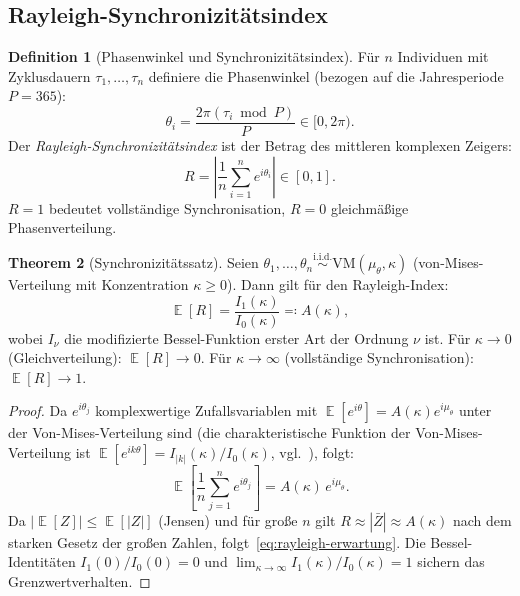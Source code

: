 ﻿\documentclass[12pt, a4paper]{article}
\theoremstyle{definition}
\newtheorem{theorem}{Theorem}[section]
\newtheorem{definition}[theorem]{Definition}
\DeclareMathOperator{\E}{\mathbb{E}}
\begin{document}
\subsection{Rayleigh-Synchronizitätsindex}

\begin{definition}[Phasenwinkel und Synchronizitätsindex]\label{def:rayleigh}
Für $n$ Individuen mit Zyklusdauern $\tau_1, \ldots, \tau_n$ definiere die
Phasenwinkel (bezogen auf die Jahresperiode $P = 365$):
\[
  \theta_i = \frac{2\pi (\tau_i \bmod P)}{P} \in [0, 2\pi).
\]
Der \emph{Rayleigh-Synchronizitätsindex} ist der Betrag des mittleren komplexen
Zeigers:
\begin{equation}\label{eq:rayleigh}
  R = \left|\frac{1}{n}\sum_{i=1}^n e^{i\theta_i}\right| \in [0, 1].
\end{equation}
$R = 1$ bedeutet vollständige Synchronisation, $R = 0$ gleichmäßige Phasenverteilung.
\end{definition}

\begin{theorem}[Synchronizitätssatz]\label{thm:synchronizitaet}
Seien $\theta_1, \ldots, \theta_n \overset{\text{i.i.d.}}{\sim} \mathrm{VM}(\mu_\theta, \kappa)$
(von-Mises-Verteilung mit Konzentration $\kappa \geq 0$). Dann gilt für den
Rayleigh-Index:
\begin{equation}\label{eq:rayleigh-erwartung}
  \E[R] = \frac{I_1(\kappa)}{I_0(\kappa)} \eqqcolon A(\kappa),
\end{equation}
wobei $I_\nu$ die modifizierte Bessel-Funktion erster Art der Ordnung $\nu$ ist.
Für $\kappa \to 0$ (Gleichverteilung): $\E[R] \to 0$. Für $\kappa \to \infty$
(vollständige Synchronisation): $\E[R] \to 1$.
\end{theorem}

\begin{proof}
Da $e^{i\theta_j}$ komplexwertige Zufallsvariablen mit $\E[e^{i\theta}] = A(\kappa) e^{i\mu_\theta}$
unter der Von-Mises-Verteilung sind (die charakteristische Funktion der
Von-Mises-Verteilung ist $\E[e^{ik\theta}] = I_{|k|}(\kappa)/I_0(\kappa)$,
vgl.~\cite{Mardia1972}), folgt:
\[
  \E\!\left[\frac{1}{n}\sum_{j=1}^n e^{i\theta_j}\right] = A(\kappa)\,e^{i\mu_\theta}.
\]
Da $\left|\E[Z]\right| \leq \E[|Z|]$ (Jensen) und für große $n$ gilt
$R \approx \left|\bar{Z}\right| \approx A(\kappa)$ nach dem starken Gesetz der
großen Zahlen, folgt~\eqref{eq:rayleigh-erwartung}. Die Bessel-Identitäten
$I_1(0)/I_0(0) = 0$ und $\lim_{\kappa\to\infty} I_1(\kappa)/I_0(\kappa) = 1$
sichern das Grenzwertverhalten. \hfill
\end{proof}
\end{document}
